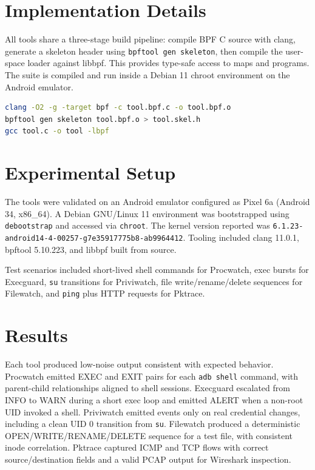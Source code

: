 \documentclass[conference]{IEEEtran}
\begin{document}
\section{Implementation Details}
All tools share a three-stage build pipeline: compile BPF C source with clang, generate a skeleton header using \texttt{bpftool gen skeleton}, then compile the user-space loader against libbpf. This provides type-safe access to maps and programs. The suite is compiled and run inside a Debian 11 chroot environment on the Android emulator.

\begin{lstlisting}[language=bash,caption={Per-tool build pipeline}]
clang -O2 -g -target bpf -c tool.bpf.c -o tool.bpf.o
bpftool gen skeleton tool.bpf.o > tool.skel.h
gcc tool.c -o tool -lbpf
\end{lstlisting}

\section{Experimental Setup}
The tools were validated on an Android emulator configured as Pixel 6a (Android 34, x86\_64). A Debian GNU/Linux 11 environment was bootstrapped using \texttt{debootstrap} and accessed via \texttt{chroot}. The kernel version reported was \texttt{6.1.23-android14-4-00257-g7e35917775b8-ab9964412}. Tooling included clang 11.0.1, bpftool 5.10.223, and libbpf built from source.

Test scenarios included short-lived shell commands for Procwatch, exec bursts for Execguard, \texttt{su} transitions for Priviwatch, file write/rename/delete sequences for Filewatch, and \texttt{ping} plus HTTP requests for Pktrace.

\section{Results}
Each tool produced low-noise output consistent with expected behavior. Procwatch emitted EXEC and EXIT pairs for each \texttt{adb shell} command, with parent-child relationships aligned to shell sessions. Execguard escalated from INFO to WARN during a short exec loop and emitted ALERT when a non-root UID invoked a shell. Priviwatch emitted events only on real credential changes, including a clean UID 0 transition from \texttt{su}. Filewatch produced a deterministic OPEN/WRITE/RENAME/DELETE sequence for a test file, with consistent inode correlation. Pktrace captured ICMP and TCP flows with correct source/destination fields and a valid PCAP output for Wireshark inspection.
\end{document}
